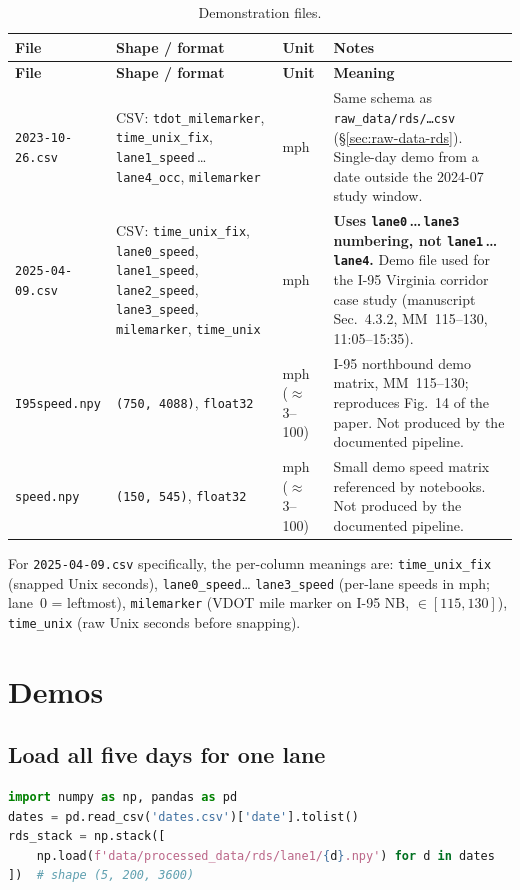 \documentclass[11pt]{article}
\newcommand{\code}[1]{\texttt{#1}}
\newcommand{\filename}[1]{\textcolor{accent}{\code{#1}}}
\begin{document}
{\small
\begin{longtable}{L{2.6cm} L{4.6cm} L{2.0cm} L{6.4cm}}
\caption{Demonstration files.}
\label{tab:demo}\\
\toprule
\textbf{File} & \textbf{Shape / format} & \textbf{Unit} & \textbf{Notes} \\
\midrule
\endfirsthead
\toprule
\textbf{File} & \textbf{Shape / format} & \textbf{Unit} & \textbf{Meaning} \\
\midrule
\endhead
\filename{2023-10-26.csv} & CSV: \code{tdot\_milemarker}, \code{time\_unix\_fix}, \code{lane1\_speed}\,\dots\,\code{lane4\_occ}, \code{milemarker} & mph & Same schema as \code{raw\_data/rds/\dots csv} (\S\ref{sec:raw-data-rds}). Single-day demo from a date outside the 2024-07 study window. \\
\filename{2025-04-09.csv} & CSV: \code{time\_unix\_fix}, \code{lane0\_speed}, \code{lane1\_speed}, \code{lane2\_speed}, \code{lane3\_speed}, \code{milemarker}, \code{time\_unix} & mph & \textbf{Uses \code{lane0}\,\dots\,\code{lane3} numbering, not \code{lane1}\,\dots\,\code{lane4}.} Demo file used for the I-95 Virginia corridor case study (manuscript Sec.~4.3.2, MM~115--130, 11:05--15:35). \\
\filename{I95speed.npy} & \code{(750, 4088)}, \code{float32} & mph ($\approx$3--100) & I-95 northbound demo matrix, MM~115--130; reproduces Fig.~14 of the paper. Not produced by the documented pipeline. \\
\filename{speed.npy}    & \code{(150, 545)}, \code{float32}  & mph ($\approx$3--100) & Small demo speed matrix referenced by notebooks. Not produced by the documented pipeline. \\
\bottomrule
\end{longtable}
}

\noindent For \filename{2025-04-09.csv} specifically, the per-column meanings
are: \code{time\_unix\_fix} (snapped Unix seconds), \code{lane0\_speed}\dots
\code{lane3\_speed} (per-lane speeds in mph; lane~0 = leftmost),
\code{milemarker} (VDOT mile marker on I-95 NB, $\in [115, 130]$),
\code{time\_unix} (raw Unix seconds before snapping).

\section{Demos}
\label{sec:cookbook}

\subsection*{Load all five days for one lane}
\begin{lstlisting}[language=Python]
import numpy as np, pandas as pd
dates = pd.read_csv('dates.csv')['date'].tolist()
rds_stack = np.stack([
    np.load(f'data/processed_data/rds/lane1/{d}.npy') for d in dates
])  # shape (5, 200, 3600)
\end{lstlisting}
\end{document}
